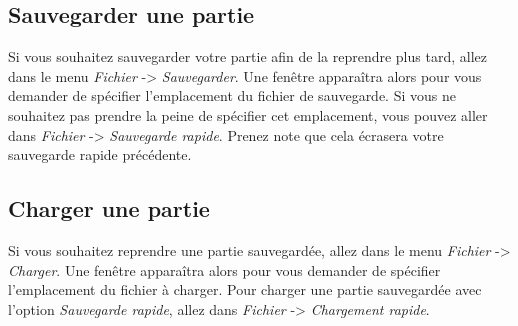 \subsection {Sauvegarder une partie}
Si vous souhaitez sauvegarder votre partie afin de la reprendre plus tard, allez dans le menu \emph{Fichier} -> \emph{Sauvegarder}.
Une fenêtre apparaîtra alors pour vous demander de spécifier l'emplacement du fichier de sauvegarde.
Si vous ne souhaitez pas prendre la peine de spécifier cet emplacement, vous pouvez aller dans \emph{Fichier} -> \emph{Sauvegarde rapide}.
Prenez note que cela écrasera votre sauvegarde rapide précédente.

\subsection {Charger une partie}
Si vous souhaitez reprendre une partie sauvegardée, allez dans le menu \emph{Fichier} -> \emph{Charger}.
Une fenêtre apparaîtra alors pour vous demander de spécifier l'emplacement du fichier à charger.
Pour charger une partie sauvegardée avec l'option \emph{Sauvegarde rapide}, allez dans \emph{Fichier} -> \emph{Chargement rapide}.

